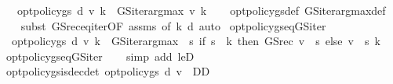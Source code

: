 \begin{isabellebody}
\ \ \ {\isachardoublequoteopen}opt{\isacharunderscore}{\kern0pt}policy{\isacharunderscore}{\kern0pt}gs{\isacharprime}{\kern0pt}\ d\ v\ k\ {\isacharequal}{\kern0pt}\ GS{\isacharunderscore}{\kern0pt}iter{\isacharunderscore}{\kern0pt}arg{\isacharunderscore}{\kern0pt}max\ v{\isacharprime}{\kern0pt}\ k{\isachardoublequoteclose}\isanewline
%
\isadelimproof
\ \ %
\endisadelimproof
%
\isatagproof
{}\isamarkupfalse%
\ opt{\isacharunderscore}{\kern0pt}policy{\isacharunderscore}{\kern0pt}gs{\isacharprime}{\kern0pt}{\isacharunderscore}{\kern0pt}def\ GS{\isacharunderscore}{\kern0pt}iter{\isacharunderscore}{\kern0pt}arg{\isacharunderscore}{\kern0pt}max{\isacharunderscore}{\kern0pt}def\isanewline
\ \ \isamarkupfalse%
\ {\isacharparenleft}{\kern0pt}subst\ GS{\isacharunderscore}{\kern0pt}rec{\isacharunderscore}{\kern0pt}eq{\isacharunderscore}{\kern0pt}iter{\isacharbrackleft}{\kern0pt}OF\ assms{\isacharcomma}{\kern0pt}\ of\ k\ d{\isacharbrackright}{\kern0pt}{\isacharparenright}{\kern0pt}\ auto%
\endisatagproof
{\isafoldproof}%
%
\isadelimproof
\isanewline
%
\endisadelimproof
\isanewline
{}\isamarkupfalse%
\ opt{\isacharunderscore}{\kern0pt}policy{\isacharunderscore}{\kern0pt}gs{\isacharprime}{\kern0pt}{\isacharunderscore}{\kern0pt}eq{\isacharunderscore}{\kern0pt}GS{\isacharunderscore}{\kern0pt}iter{\isacharprime}{\kern0pt}{\isacharcolon}{\kern0pt}\isanewline
\ \ {\isachardoublequoteopen}opt{\isacharunderscore}{\kern0pt}policy{\isacharunderscore}{\kern0pt}gs{\isacharprime}{\kern0pt}\ d\ v\ k\ {\isacharequal}{\kern0pt}\ GS{\isacharunderscore}{\kern0pt}iter{\isacharunderscore}{\kern0pt}arg{\isacharunderscore}{\kern0pt}max\ {\isacharparenleft}{\kern0pt}{\isasymchi}\ s{\isachardot}{\kern0pt}\ if\ s\ {\isacharless}{\kern0pt}\ k\ then\ GS{\isacharunderscore}{\kern0pt}rec\ v\ {\isachardollar}{\kern0pt}\ s\ else\ v\ {\isachardollar}{\kern0pt}\ s{\isacharparenright}{\kern0pt}\ k{\isachardoublequoteclose}\isanewline
%
\isadelimproof
\ \ %
\endisadelimproof
%
\isatagproof
{}\isamarkupfalse%
\ opt{\isacharunderscore}{\kern0pt}policy{\isacharunderscore}{\kern0pt}gs{\isacharprime}{\kern0pt}{\isacharunderscore}{\kern0pt}eq{\isacharunderscore}{\kern0pt}GS{\isacharunderscore}{\kern0pt}iter\isanewline
\ \ \isamarkupfalse%
\ {\isacharparenleft}{\kern0pt}simp\ add{\isacharcolon}{\kern0pt}\ leD{\isacharparenright}{\kern0pt}%
\endisatagproof
{\isafoldproof}%
%
\isadelimproof
\isanewline
%
\endisadelimproof
\isanewline
{}\isamarkupfalse%
\ opt{\isacharunderscore}{\kern0pt}policy{\isacharunderscore}{\kern0pt}gs{\isacharprime}{\kern0pt}{\isacharunderscore}{\kern0pt}is{\isacharunderscore}{\kern0pt}dec{\isacharunderscore}{\kern0pt}det{\isacharcolon}{\kern0pt}\ {\isachardoublequoteopen}opt{\isacharunderscore}{\kern0pt}policy{\isacharunderscore}{\kern0pt}gs{\isacharprime}{\kern0pt}\ d\ v\ {\isasymin}\ D\isactrlsub D{\isachardoublequoteclose}\isanewline

\end{isabellebody}
